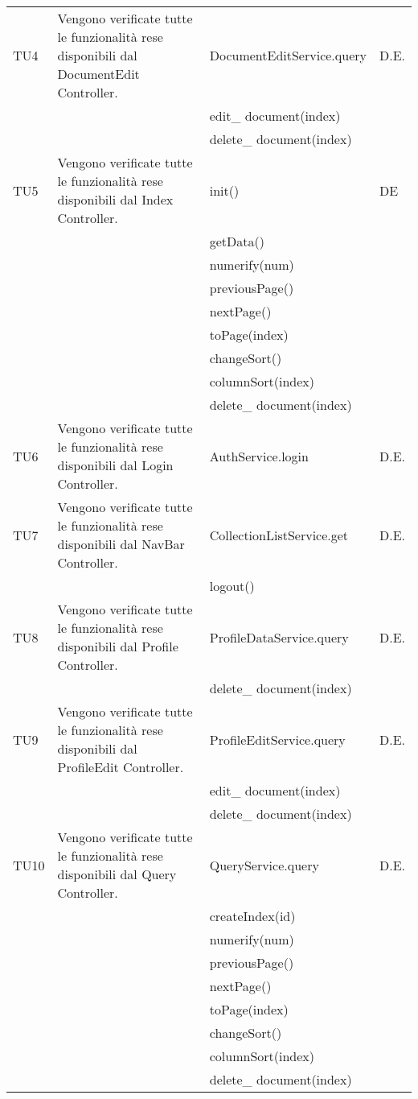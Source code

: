 \begin{center}
\begin{longtable}{|p{1cm}|p{5cm}|p{6cm}|p{1cm}|}
\midrule
TU4
& Vengono verificate tutte le funzionalità rese disponibili dal DocumentEdit Controller.
& DocumentEditService.query
& D.E.\\
& & edit\_ document(index) &\\
& & delete\_ document(index) &\\



\midrule
TU5
& Vengono verificate tutte le funzionalità rese disponibili dal Index Controller.
&  init() & DE\\
& & getData()& \\
& &  numerify(num)& \\
& &  previousPage()& \\
& &  nextPage()& \\
& &  toPage(index)& \\
& &  changeSort()& \\
& &  columnSort(index)& \\
& &  delete\_ document(index)& \\




\midrule
TU6
& Vengono verificate tutte le funzionalità rese disponibili dal Login Controller.
& AuthService.login
& D.E.\\


\midrule
TU7
& Vengono verificate tutte le funzionalità rese disponibili dal NavBar Controller.
& CollectionListService.get
& D.E.\\
& & logout() &\\



\midrule
TU8
& Vengono verificate tutte le funzionalità rese disponibili dal Profile Controller.
& ProfileDataService.query
& D.E.\\
& & delete\_ document(index) &\\


\midrule
TU9
& Vengono verificate tutte le funzionalità rese disponibili dal ProfileEdit Controller.
& ProfileEditService.query
& D.E.\\

& & edit\_ document(index) &\\
& & delete\_ document(index) &\\


\midrule
TU10
& Vengono verificate tutte le funzionalità rese disponibili dal Query Controller.
& QueryService.query
& D.E.\\
& & createIndex(id) &\\
& & numerify(num) &\\
& & previousPage() &\\
& & nextPage() &\\
& & toPage(index) &\\
& & changeSort() &\\
& & columnSort(index) &\\
& & delete\_ document(index) &\\




\end{longtable}
\end{center}
